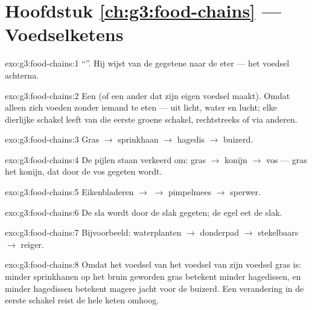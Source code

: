 \section*{Hoofdstuk \ref{ch:g3:food-chains} --- Voedselketens}

\begin{solution}{exo:g3:food-chains:1}
``''. Hij wijst van de gegetene naar de eter --- het
voedsel achterna.
\end{solution}

\begin{solution}{exo:g3:food-chains:2}
Een  (of een ander  dat zijn eigen voedsel maakt).
Omdat alleen  zich voeden zonder iemand te eten --- uit licht,
water en lucht; elke dierlijke schakel leeft van die eerste groene
schakel, rechtstreeks of via anderen.
\end{solution}

\begin{solution}{exo:g3:food-chains:3}
Gras $\rightarrow$ sprinkhaan $\rightarrow$ hagedis $\rightarrow$
buizerd.
\end{solution}

\begin{solution}{exo:g3:food-chains:4}
De pijlen staan verkeerd om: gras $\rightarrow$ konijn $\rightarrow$
vos --- gras  het konijn, dat door de vos gegeten
wordt.
\end{solution}

\begin{solution}{exo:g3:food-chains:5}
Eikenbladeren $\rightarrow$  $\rightarrow$ pimpelmees
$\rightarrow$ sperwer.
\end{solution}

\begin{solution}{exo:g3:food-chains:6}
De sla wordt door de slak gegeten; de egel eet de slak.
\end{solution}

\begin{solution}{exo:g3:food-chains:7}
Bijvoorbeeld: waterplanten $\rightarrow$ donderpad $\rightarrow$
stekelbaars $\rightarrow$ reiger.
\end{solution}

\begin{solution}{exo:g3:food-chains:8}
Omdat het voedsel van het voedsel van zijn voedsel gras is: minder
sprinkhanen op het bruin geworden gras betekent minder hagedissen, en
minder hagedissen betekent magere jacht voor de buizerd. Een
verandering in de eerste schakel reist de hele keten omhoog.
\end{solution}

